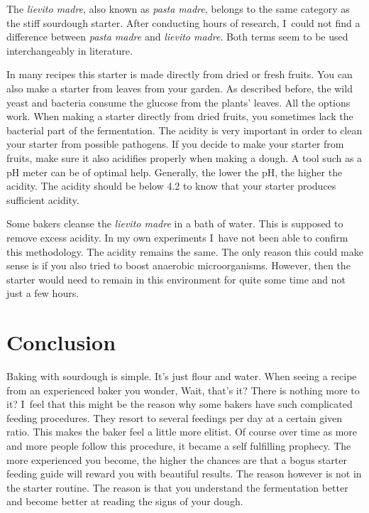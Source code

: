 The \emph{lievito madre}, also known as \emph{pasta madre}, belongs to the
same category as the stiff sourdough starter. After conducting hours of
research, I~could not find a difference between \emph{pasta madre} and
\emph{lievito madre}. Both terms seem to be used interchangeably in
literature.

In many recipes this starter is made directly
from dried or fresh fruits. You can also make a starter from leaves from your
garden. As described before, the wild yeast and bacteria consume the glucose
from the plants' leaves. All the options work. When making a starter directly
from dried fruits, you sometimes lack the bacterial part of the fermentation.
The acidity is very important in order to clean your starter from possible
pathogens. If you decide to make your starter from fruits, make sure it also
acidifies properly when making a dough. A tool such as a pH meter can be of
optimal help. Generally, the lower the pH, the higher the acidity. The acidity
should be below 4.2 to know that your starter produces sufficient acidity.

Some bakers cleanse the \emph{lievito madre} in a bath of water. This is supposed to
remove excess acidity. In my own experiments I~have not been able to confirm
this methodology. The acidity remains the same. The only reason this could
make sense is if you also tried to boost anaerobic microorganisms. However, then the
starter would need to remain in this environment for quite some time and not just
a few hours.

\section{Conclusion}%
\label{sec:starter-type-conclusion}
Baking with sourdough is simple. It's just flour and water. When seeing a recipe
from an experienced baker you wonder, Wait, that's it? There is nothing more
to it? I~feel that this might be the reason why some bakers have such complicated
feeding procedures. They resort to several feedings per day at a certain given ratio.
This makes the baker feel a little more elitist. Of course over time as
more and more people follow this procedure, it became a self fulfilling prophecy.
The more experienced you become, the higher the chances are that a bogus starter
feeding guide will reward you with beautiful results. The reason however is
not in the starter routine. The reason is that you understand the fermentation better
and become better at reading the signs of your dough.

